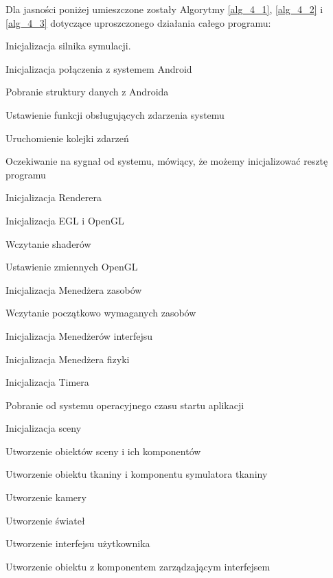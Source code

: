 	Dla jasności poniżej umieszczone zostały Algorytmy \ref{alg_4_1}, \ref{alg_4_2} i \ref{alg_4_3} dotyczące uproszczonego działania całego programu:
	
	\begin{algorithm}
		\label{alg_4_1}
		\caption{Inicjalizacja silnika symulacji.}
			
				Inicjalizacja połączenia z systemem Android
				
				\Indp
				
					Pobranie struktury danych z Androida
					
					Ustawienie funkcji obsługujących zdarzenia systemu
					
					Uruchomienie kolejki zdarzeń
					
					Oczekiwanie na sygnał od systemu, mówiący, że możemy inicjalizować resztę programu
				
				\Indm
									
				Inicjalizacja Renderera
				
				\Indp
				
					Inicjalizacja EGL i OpenGL
					
					Wczytanie shaderów
					
					Ustawienie zmiennych OpenGL
					
				\Indm	
				
				Inicjalizacja Menedżera zasobów
				
				\Indp
					
					Wczytanie początkowo wymaganych zasobów
				
				\Indm	
				
				Inicjalizacja Menedżerów interfejsu
				
				Inicjalizacja Menedżera fizyki
				
				Inicjalizacja Timera
				
				\Indp
				
					Pobranie od systemu operacyjnego czasu startu aplikacji
				
				\Indm
				
				Inicjalizacja sceny
				
				\Indp
				
					Utworzenie obiektów sceny i ich komponentów
					
					Utworzenie obiektu tkaniny i komponentu symulatora tkaniny
					
					Utworzenie kamery
					
					Utworzenie świateł
					
					Utworzenie interfejsu użytkownika
					
					Utworzenie obiektu z komponentem zarządzającym interfejsem
				
				\Indm			
	\end{algorithm}
	
